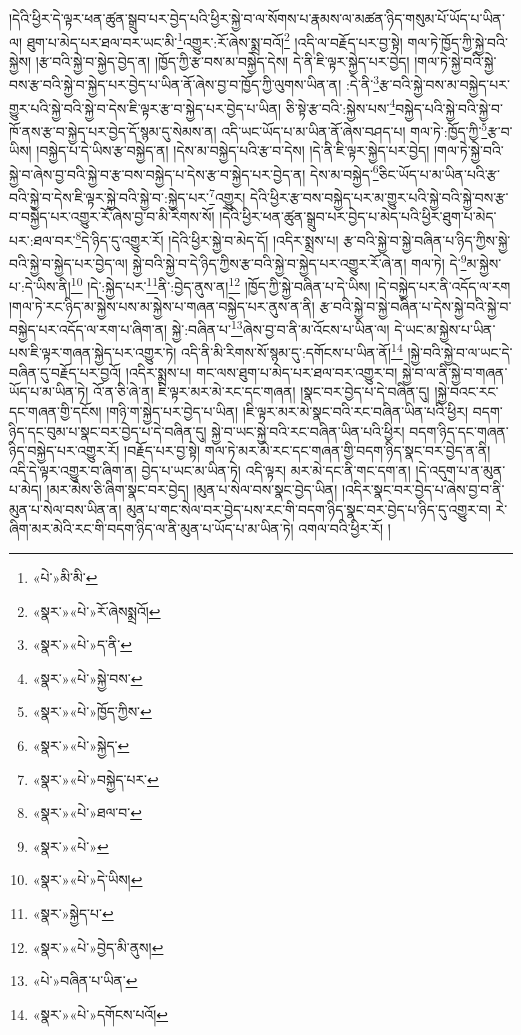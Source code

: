 །དེའི་ཕྱིར་དེ་ལྟར་ཕན་ཚུན་སྒྲུབ་པར་བྱེད་པའི་ཕྱིར་སྐྱེ་བ་ལ་སོགས་པ་རྣམས་ལ་མཚན་ཉིད་གསུམ་པོ་ཡོད་པ་ཡིན་ལ། ཐུག་པ་མེད་པར་ཐལ་བར་ཡང་མི་\footnote{«པེ་»མི་མི་}འགྱུར་:རོ་ཞེས་སྨྲ་བའོ།\footnote{«སྣར་»«པེ་»རོ་ཞེསསྨྲའོ།} །འདི་ལ་བརྗོད་པར་བྱ་སྟེ། གལ་ཏེ་ཁྱོད་ཀྱི་སྐྱེ་བའི་སྐྱེས། །རྩ་བའི་སྐྱེ་བ་སྐྱེད་བྱེད་ན། །ཁྱོད་ཀྱི་རྩ་བས་མ་བསྐྱེད་དེས། དེ་ནི་ཇི་ལྟར་སྐྱེད་པར་བྱེད། །གལ་ཏེ་སྐྱེ་བའི་སྐྱེ་བས་རྩ་བའི་སྐྱེ་བ་སྐྱེད་པར་བྱེད་པ་ཡིན་ནོ་ཞེས་བྱ་བ་ཁྱོད་ཀྱི་ལུགས་ཡིན་ན། :དེ་ནི་\footnote{«སྣར་»«པེ་»ད་ནི་}རྩ་བའི་སྐྱེ་བས་མ་བསྐྱེད་པར་གྱུར་པའི་སྐྱེ་བའི་སྐྱེ་བ་དེས་ཇི་ལྟར་རྩ་བ་སྐྱེད་པར་བྱེད་པ་ཡིན། ཅི་སྟེ་རྩ་བའི་:སྐྱེས་པས་\footnote{«སྣར་»«པེ་»སྐྱེ་བས་}བསྐྱེད་པའི་སྐྱེ་བའི་སྐྱེ་བ་ཁོ་ནས་རྩ་བ་སྐྱེད་པར་བྱེད་དོ་སྙམ་དུ་སེམས་ན། འདི་ཡང་ཡོད་པ་མ་ཡིན་ནོ་ཞེས་བཤད་པ། གལ་ཏེ་:ཁྱོད་ཀྱི་\footnote{«སྣར་»«པེ་»ཁྱོད་ཀྱིས་}རྩ་བ་ཡིས། །བསྐྱེད་པ་དེ་ཡིས་རྩ་བསྐྱེད་ན། །དེས་མ་བསྐྱེད་པའི་རྩ་བ་དེས། །དེ་ནི་ཇི་ལྟར་སྐྱེད་པར་བྱེད། །གལ་ཏེ་སྐྱེ་བའི་སྐྱེ་བ་ཞེས་བྱ་བའི་སྐྱེ་བ་རྩ་བས་བསྐྱེད་པ་དེས་རྩ་བ་སྐྱེད་པར་བྱེད་ན། དེས་མ་བསྐྱེད་\footnote{«སྣར་»«པེ་»སྐྱེད་}ཅིང་ཡོད་པ་མ་ཡིན་པའི་རྩ་བའི་སྐྱེ་བ་དེས་ཇི་ལྟར་སྐྱེ་བའི་སྐྱེ་བ་:སྐྱེད་པར་\footnote{«སྣར་»«པེ་»བསྐྱེད་པར་}འགྱུར། དེའི་ཕྱིར་རྩ་བས་བསྐྱེད་པར་མ་གྱུར་པའི་སྐྱེ་བའི་སྐྱེ་བས་རྩ་བ་བསྐྱེད་པར་འགྱུར་རོ་ཞེས་བྱ་བ་མི་རིགས་སོ། །དེའི་ཕྱིར་ཕན་ཚུན་སྒྲུབ་པར་བྱེད་པ་མེད་པའི་ཕྱིར་ཐུག་པ་མེད་པར་:ཐལ་བར་\footnote{«སྣར་»«པེ་»ཐལ་བ་}དེ་ཉིད་དུ་འགྱུར་རོ། །དེའི་ཕྱིར་སྐྱེ་བ་མེད་དོ། །འདིར་སྨྲས་པ། རྩ་བའི་སྐྱེ་བ་སྐྱེ་བཞིན་པ་ཉིད་ཀྱིས་སྐྱེ་བའི་སྐྱེ་བ་སྐྱེད་པར་བྱེད་ལ། སྐྱེ་བའི་སྐྱེ་བ་དེ་ཉིད་ཀྱིས་རྩ་བའི་སྐྱེ་བ་སྐྱེད་པར་འགྱུར་རོ་ཞེ་ན། གལ་ཏེ། དེ་\footnote{«སྣར་»«པེ་»}མ་སྐྱེས་པ་:དེ་ཡིས་ནི།\footnote{«སྣར་»«པེ་»དེ་ཡིས།} །དེ་:སྐྱེད་པར་\footnote{«སྣར་»སྐྱེད་པ་}ནི་:བྱེད་ནུས་ན།\footnote{«སྣར་»«པེ་»བྱེད་མི་ནུས།} །ཁྱོད་ཀྱི་སྐྱེ་བཞིན་པ་དེ་ཡིས། །དེ་བསྐྱེད་པར་ནི་འདོད་ལ་རག །གལ་ཏེ་རང་ཉིད་མ་སྐྱེས་པས་མ་སྐྱེས་པ་གཞན་བསྐྱེད་པར་ནུས་ན་ནི། རྩ་བའི་སྐྱེ་བ་སྐྱེ་བཞིན་པ་དེས་སྐྱེ་བའི་སྐྱེ་བ་བསྐྱེད་པར་འདོད་ལ་རག་པ་ཞིག་ན། སྐྱེ་:བཞིན་པ་\footnote{«པེ་»བཞིན་པ་ཡིན་}ཞེས་བྱ་བ་ནི་མ་འོངས་པ་ཡིན་ལ། དེ་ཡང་མ་སྐྱེས་པ་ཡིན་པས་ཇི་ལྟར་གཞན་སྐྱེད་པར་འགྱུར་ཏེ། འདི་ནི་མི་རིགས་སོ་སྙམ་དུ་:དགོངས་པ་ཡིན་ནོ།\footnote{«སྣར་»«པེ་»དགོངས་པའོ།} །སྐྱེ་བའི་སྐྱེ་བ་ལ་ཡང་དེ་བཞིན་དུ་བརྗོད་པར་བྱའོ། །འདིར་སྨྲས་པ། གང་ལས་ཐུག་པ་མེད་པར་ཐལ་བར་འགྱུར་བ། སྐྱེ་བ་ལ་ནི་སྐྱེ་བ་གཞན་ཡོད་པ་མ་ཡིན་ཏེ། འོ་ན་ཅི་ཞེ་ན། ཇི་ལྟར་མར་མེ་རང་དང་གཞན། །སྣང་བར་བྱེད་པ་དེ་བཞིན་དུ། །སྐྱེ་བའང་རང་དང་གཞན་གྱི་དངོས། །གཉི་ག་སྐྱེད་པར་བྱེད་པ་ཡིན། །ཇི་ལྟར་མར་མེ་སྣང་བའི་རང་བཞིན་ཡིན་པའི་ཕྱིར། བདག་ཉིད་དང་བུམ་པ་སྣང་བར་བྱེད་པ་དེ་བཞིན་དུ། སྐྱེ་བ་ཡང་སྐྱེ་བའི་རང་བཞིན་ཡིན་པའི་ཕྱིར། བདག་ཉིད་དང་གཞན་ཉིད་བསྐྱེད་པར་འགྱུར་རོ། །བརྗོད་པར་བྱ་སྟེ། གལ་ཏེ་མར་མེ་རང་དང་གཞན་གྱི་བདག་ཉིད་སྣང་བར་བྱེད་ན་ནི། འདི་དེ་ལྟར་འགྱུར་བ་ཞིག་ན། བྱེད་པ་ཡང་མ་ཡིན་ཏེ། འདི་ལྟར། མར་མེ་དང་ནི་གང་དག་ན། །དེ་འདུག་པ་ན་མུན་པ་མེད། །མར་མེས་ཅི་ཞིག་སྣང་བར་བྱེད། །མུན་པ་སེལ་བས་སྣང་བྱེད་ཡིན། །འདིར་སྣང་བར་བྱེད་པ་ཞེས་བྱ་བ་ནི་མུན་པ་སེལ་བས་ཡིན་ན། མུན་པ་གང་སེལ་བར་བྱེད་པས་རང་གི་བདག་ཉིད་སྣང་བར་བྱེད་པ་ཉིད་དུ་འགྱུར་བ། རེ་ཞིག་མར་མེའི་རང་གི་བདག་ཉིད་ལ་ནི་མུན་པ་ཡོད་པ་མ་ཡིན་ཏེ། འགལ་བའི་ཕྱིར་རོ། །
